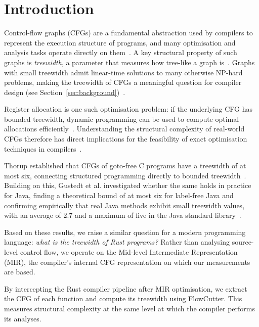 \section{Introduction}
\label{sec:introduction}

Control-flow graphs (CFGs) are a fundamental abstraction used by compilers to represent the execution structure of programs, and many optimisation and analysis tasks operate directly on them~\cite{allen_1970}.
A key structural property of such graphs is \emph{treewidth}, a parameter that measures how tree-like a graph is~\cite{bodlaender_1993}.
Graphs with small treewidth admit linear-time solutions to many otherwise NP-hard problems, making the treewidth of CFGs a meaningful question for compiler design (see Section~\ref{sec:background})~\cite{thorup_1998}.

Register allocation is one such optimisation problem: if the underlying CFG has bounded treewidth, dynamic programming can be used to compute optimal allocations efficiently~\cite{thorup_1998}.
Understanding the structural complexity of real-world CFGs therefore has direct implications for the feasibility of exact optimisation techniques in compilers~\cite{bodlaender_1988}.

Thorup established that CFGs of goto-free C programs have a treewidth of at most six, connecting structured programming directly to bounded treewidth~\cite{thorup_1998}.
Building on this, Gustedt et al. investigated whether the same holds in practice for Java, finding a theoretical bound of at most six for label-free Java and confirming empirically that real Java methods exhibit small treewidth values, with an average of 2.7 and a maximum of five in the Java standard library~\cite{gustedt_2002}.

Based on these results, we raise a similar question for a modern programming language: \textit{what is the treewidth of Rust programs?}
Rather than analysing source-level control flow, we operate on the Mid-level Intermediate Representation (MIR), the compiler's internal CFG representation on which our measurements are based.

By intercepting the Rust compiler pipeline after MIR optimisation, we extract the CFG of each function and compute its treewidth using FlowCutter.
This measures structural complexity at the same level at which the compiler performs its analyses.
\linebreak


